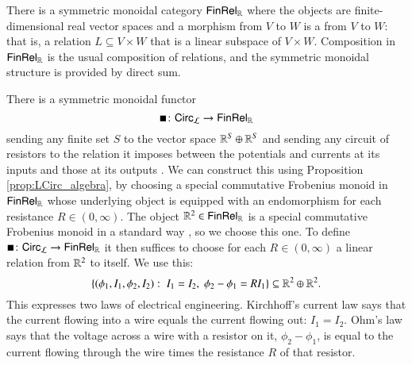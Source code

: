 \documentclass[reqno]{amsart}
\begin{document}
There is a symmetric monoidal category $\mathsf{Fin}\mathsf{Rel}_{\mathbb{R}}$ where the objects are finite-dimensional real vector spaces and a morphism from $V$ to $W$ is a  from $V$ to $W$: that is, a relation $L \subseteq V \times W$ that is a linear subspace of $V \times W$.   Composition in $\mathsf{Fin}\mathsf{Rel}_{\mathbb{R}}$ is the usual composition of relations, and the symmetric monoidal structure is provided by direct sum.  

There is a symmetric monoidal functor
\[   \blacksquare \colon \mathsf{Circ}_{\mathcal{L}} \to \mathsf{Fin}\mathsf{Rel}_{\mathbb{R}}  \]
sending any finite set $S$ to the vector space $\mathbb{R}^S \oplus \mathbb{R}^S$ and
sending any circuit of resistors to the relation it imposes between the potentials and currents at its inputs and those at its outputs \cite[Section 9]{BCR}.   We can construct this using Proposition \ref{prop:LCirc_algebra}, by choosing a special commutative Frobenius monoid in $\mathsf{Fin}\mathsf{Rel}_{\mathbb{R}}$ whose underlying object is equipped with an endomorphism for each resistance $R \in (0,\infty)$.   The object $\mathbb{R}^2 \in \mathsf{Fin}\mathsf{Rel}_{\mathbb{R}}$ is a special commutative Frobenius monoid in a standard way \cite[Section\ 8]{BCR}, so we choose this one.   To define $\blacksquare \colon \mathsf{Circ}_{\mathcal{L}} \to \mathsf{Fin}\mathsf{Rel}_{\mathbb{R}}$ it then suffices to choose for each $R \in (0,\infty)$ a linear relation from $\mathbb{R}^2$ to itself.   We use this:
\[ \left\{(\phi_1,I_1,\phi_2,I_2) : \; I_1 = I_2 , \; \phi_2-\phi_1 = R I_1\right\} 
 \subseteq \mathbb{R}^2 \oplus \mathbb{R}^2.\]
This expresses two laws of electrical engineering.   Kirchhoff's current law says that the 
current flowing into a wire equals the current flowing out: $I_1 = I_2$.   Ohm's law says that the voltage across a wire with a resistor on it, $\phi_2 - \phi_1$, is equal to the current flowing through the wire times the resistance $R$ of that resistor.
\end{document}
